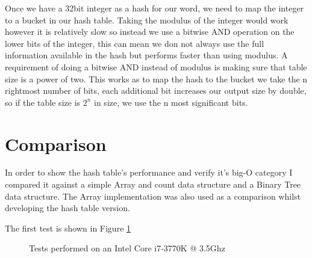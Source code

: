 \documentclass[12pt]{article}
\begin{document}
Once we have a 32bit integer as a hash for our word, we need to map the integer to a bucket in our hash table. Taking the modulus of the integer would work however it is relatively slow so instead we use a bitwise AND operation on the lower bits of the integer, this can mean we don not always use the full information available in the hash but performs faster than using modulus. A requirement of doing a bitwise AND instead of modulus is making sure that table size is a power of two. This works as to map the hash to the bucket we take the n rightmost number of bits, each additional bit increases our output size by double, so if the table size is $2^n$ in size, we use the n most significant bits.

\section{Comparison}

In order to show the hash table's performance and verify it's big-O category I compared it against a simple Array and count data structure and a Binary Tree data structure. The Array implementation was also used as a comparison whilst developing the hash table version.

The first test is shown in Figure \ref{fig:add_chart}

\begin{figure}[!htb]
\caption{Tests performed on an Intel Core i7-3770K @ 3.5Ghz}
\label{fig:add_chart}
\end{figure}
\end{document}
